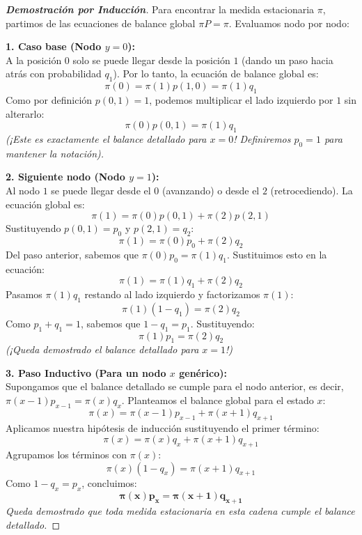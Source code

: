 \documentclass[10pt,a4paper]{article}
\begin{document}
\vspace{5mm}

\begin{proof}[\textbf{Demostración por Inducción}]
    Para encontrar la medida estacionaria $\pi$, partimos de las ecuaciones de balance global $\pi P = \pi$. Evaluamos nodo por nodo:
    
    \textbf{1. Caso base (Nodo $y = 0$):} \\
    A la posición $0$ solo se puede llegar desde la posición $1$ (dando un paso hacia atrás con probabilidad $q_1$). Por lo tanto, la ecuación de balance global es:
    \[ \pi(0) = \pi(1) p(1, 0) = \pi(1) q_1 \]
    Como por definición $p(0, 1) = 1$, podemos multiplicar el lado izquierdo por $1$ sin alterarlo:
    \[ \pi(0) p(0, 1) = \pi(1) q_1 \]
    \textit{(¡Este es exactamente el balance detallado para $x = 0$! Definiremos $p_0 = 1$ para mantener la notación).}

    \textbf{2. Siguiente nodo (Nodo $y = 1$):} \\
    Al nodo $1$ se puede llegar desde el $0$ (avanzando) o desde el $2$ (retrocediendo). La ecuación global es:
    \[ \pi(1) = \pi(0) p(0, 1) + \pi(2) p(2, 1) \]
    Sustituyendo $p(0,1) = p_0$ y $p(2,1) = q_2$:
    \[ \pi(1) = \pi(0) p_0 + \pi(2) q_2 \]
    Del paso anterior, sabemos que $\pi(0) p_0 = \pi(1) q_1$. Sustituimos esto en la ecuación:
    \[ \pi(1) = \pi(1) q_1 + \pi(2) q_2 \]
    Pasamos $\pi(1) q_1$ restando al lado izquierdo y factorizamos $\pi(1)$:
    \[ \pi(1)(1 - q_1) = \pi(2) q_2 \]
    Como $p_1 + q_1 = 1$, sabemos que $1 - q_1 = p_1$. Sustituyendo:
    \[ \pi(1) p_1 = \pi(2) q_2 \]
    \textit{(¡Queda demostrado el balance detallado para $x = 1$!)}

    \textbf{3. Paso Inductivo (Para un nodo $x$ genérico):} \\
    Supongamos que el balance detallado se cumple para el nodo anterior, es decir, $\pi(x-1) p_{x-1} = \pi(x) q_x$.
    Planteamos el balance global para el estado $x$:
    \[ \pi(x) = \pi(x-1) p_{x-1} + \pi(x+1) q_{x+1} \]
    Aplicamos nuestra hipótesis de inducción sustituyendo el primer término:
    \[ \pi(x) = \pi(x) q_x + \pi(x+1) q_{x+1} \]
    Agrupamos los términos con $\pi(x)$:
    \[ \pi(x)(1 - q_x) = \pi(x+1) q_{x+1} \]
    Como $1 - q_x = p_x$, concluimos:
    \[ \mathbf{\pi(x) p_x = \pi(x+1) q_{x+1}} \]
    \textit{Queda demostrado que toda medida estacionaria en esta cadena cumple el balance detallado.}


\end{proof}
\end{document}
